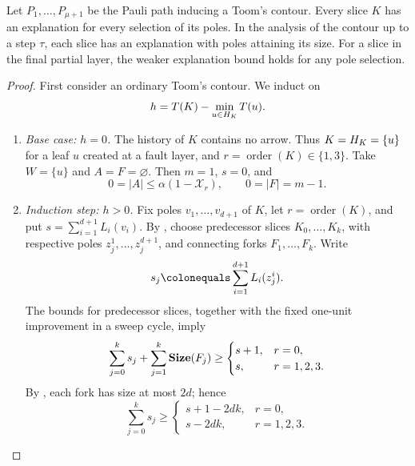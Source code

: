 \begin{claim}
  \label{claim:edgesin}
  Let $P_1,\ldots,P_{\mu+1}$ be the Pauli path inducing a Toom's contour.
  Every slice $K$ has an explanation for every selection of its poles.
  In the analysis of the contour up to a step $\tau$, each slice
  has an explanation with poles attaining its size. For a slice in the
  final partial layer, the weaker explanation bound holds for any pole
  selection.
\end{claim}

\begin{proof}
  First consider an ordinary Toom's contour. We induct on
  \[
    h=T(K)-\min_{u\in H_{K}}T(u).
  \]
  \begin{enumerate}
    \item \emph{Base case: $h=0$.}
    The history of $K$ contains no arrow. Thus $K=H_{K}=\{u\}$
    for a leaf $u$ created at a fault layer, and
    $r=\operatorname{order}(K)\in\{1,3\}$.
    Take $W=\{u\}$ and $A=F=\varnothing$. Then $m=1$, $s=0$, and
    \[
      0=|A|\leq\alpha(1-\mathcal{X}_r),
      \qquad 0=|F|=m-1.
    \]

    \item \emph{Induction step: $h>0$.}
    Fix poles $v_1,\ldots,v_{d+1}$ of $K$, let
    $r=\operatorname{order}(K)$, and put
    $s=\sum_{i=1}^{d+1}L_i(v_i)$.
    By , choose predecessor slices
    $K_0,\ldots,K_k$, with respective poles
    $z_j^1,\ldots,z_j^{d+1}$, and connecting forks
    $F_1,\ldots,F_k$. Write
    \[
      s_j\colonequals\sum_{i=1}^{d+1}L_i(z_j^i).
    \]
    The bounds for predecessor slices, together with the fixed one-unit
    improvement in a sweep cycle, imply
    \begin{equation}
      \label{eq:minimal-explanation-predecessor-spans}
      \sum_{j=0}^k s_j+\sum_{j=1}^k\mathbf{Size}(F_j)
      \geq
      \begin{cases}
        s+1,&r=0,\\
        s,&r=1,2,3.
      \end{cases}
    \end{equation}
    By , each fork has size at most $2d$;
    hence
    \begin{equation}
      \label{eq:minimal-explanation-span-sum}
      \sum_{j=0}^k s_j\geq
      \begin{cases}
        s+1-2dk,&r=0,\\
        s-2dk,&r=1,2,3.
      \end{cases}
    \end{equation}


\end{enumerate}
\end{proof}
